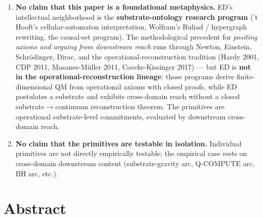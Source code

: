 \documentclass[11pt,a4paper]{article}
\begin{document}
\begin{enumerate}[noitemsep]
\item \textbf{No claim that this paper is a foundational metaphysics.} ED's intellectual neighborhood is the \textbf{substrate-ontology research program} ('t Hooft's cellular-automaton interpretation, Wolfram's Ruliad / hypergraph rewriting, the causal-set program). The methodological precedent for \emph{positing axioms and arguing from downstream reach} runs through Newton, Einstein, Schr\"odinger, Dirac, and the operational-reconstruction tradition (Hardy 2001, CDP 2011, Masanes-M\"uller 2011, Coecke-Kissinger 2017) --- but ED is \textbf{not in the operational-reconstruction lineage}: those programs derive finite-dimensional QM from operational axioms with closed proofs, while ED postulates a substrate and exhibits cross-domain reach without a closed substrate$\to$continuum reconstruction theorem. The primitives are operational substrate-level commitments, evaluated by downstream cross-domain reach.
\item \textbf{No claim that the primitives are testable in isolation.} Individual primitives are not directly empirically testable; the empirical case rests on cross-domain downstream content (substrate-gravity arc, Q-COMPUTE arc, BH arc, etc.).
\end{enumerate}

\section*{Abstract}
\end{document}
